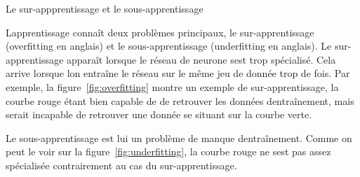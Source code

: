 \documentclass[11pt]{sdm}
\begin{document}
			\medbreak
			\begin{itshape}Le sur-appprentissage et le sous-apprentissage\end{itshape}
			\smallbreak
			L\textquotesingle apprentissage conna\^it deux probl\`emes principaux, le sur-apprentissage (overfitting en anglais) et le sous-apprentissage (underfitting en anglais).
			Le sur-apprentissage appara\^it lorsque le r\'eseau de neurone s\textquotesingle est trop sp\'ecialis\'e. Cela arrive lorsque l\textquotesingle on entra\^ine le r\'eseau sur le m\^eme jeu de donn\'ee trop de fois. Par exemple, la figure~\ref{fig:overfitting} montre un exemple de sur-apprentissage, la courbe rouge \'etant bien capable de de retrouver les donn\'ees d\textquotesingle entra\^inement, mais serait incapable de retrouver une donn\'ee se situant sur la courbe verte.

			Le sous-apprentissage est lui un probl\`eme de manque d\textquotesingle entra\^inement. Comme on peut le voir sur la figure~\ref{fig:underfitting}, la courbe rouge ne s\textquotesingle est pas assez sp\'ecialis\'ee contrairement au cas du sur-apprentissage.
\end{document}
